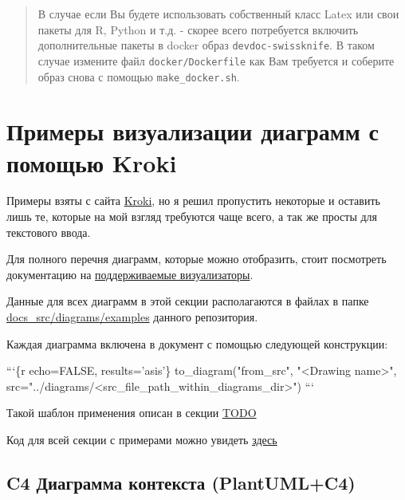 \documentclass[12pt,a4paper,12pt,oneside,openany]{book}
\newenvironment{Shaded}{\begin{snugshade}}{\end{snugshade}}
\newcommand{\DataTypeTok}[1]{\textcolor[rgb]{0.27,0.27,0.27}{#1}}
\newcommand{\StringTok}[1]{\textcolor[rgb]{0.5,0.5,0.5}{#1}}
\begin{document}
\begin{quote}
В случае если Вы будете использовать собственный класс Latex или свои пакеты для R, Python и т.д. - скорее всего потребуется включить дополнительные пакеты в docker образ \texttt{devdoc-swissknife}. В таком случае измените файл \texttt{docker/Dockerfile} как Вам требуется и соберите образ снова с помощью \texttt{make\_docker.sh}.
\end{quote}

\hypertarget{examplesKroki}{\chapter{Примеры визуализации диаграмм с помощью Kroki}\label{examplesKroki}}

Примеры взяты с сайта \href{https://kroki.io/examples.html}{Kroki}, но я решил пропустить некоторые и оставить лишь те, которые на мой взгляд требуются чаще всего, а так же просты для текстового ввода.

Для полного перечня диаграмм, которые можно отобразить, стоит посмотреть документацию на \href{https://kroki.io/\#support}{поддерживаемые визуализаторы}.

Данные для всех диаграмм в этой секции располагаются в файлах в папке \href{https://github.com/Godhart/devdoc-swissknife/tree/main/docs_src/diagrams/examples}{docs\_src/diagrams/examples} данного репозитория.

Каждая диаграмма включена в документ с помощью следующей конструкции:

\begin{Shaded}
\begin{Highlighting}[]
\StringTok{```}\DataTypeTok{\{r echo=FALSE, results='asis'\}}
\DataTypeTok{  to_diagram("from_src", "<Drawing name>", src="../diagrams/<src_file_path_within_diagrams_dir>")}
\StringTok{```}
\end{Highlighting}
\end{Shaded}

Такой шаблон применения описан в секции \protect\hyperlink{TODO}{TODO}

Код для всей секции с примерами можно увидеть \href{https://github.com/Godhart/devdoc-swissknife/blob/main/docs_src/devdoc-swissknife-en/03-KrokiExamples.Rmd}{здесь}

\newpage

\section{C4 Диаграмма контекста (PlantUML+C4)}\label{c4---plantumlc4}
\end{document}
